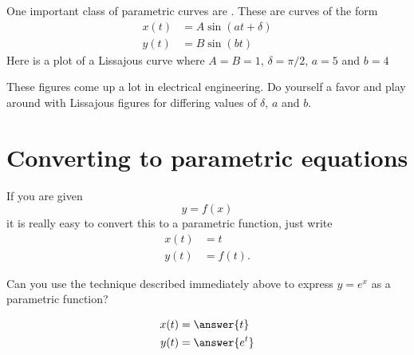 \documentclass{ximera}
\begin{document}
One important class of parametric curves are . These are curves of the form
\begin{align*}
  x(t) &= A \sin(at + \delta)\\
  y(t) &= B\sin(bt)
\end{align*}
Here is a plot of a Lissajous curve where $A=B=1$, $\delta = \pi/2$,
$a=5$ and $b=4$
\begin{image}
\end{image}
These figures come up a lot in electrical engineering. Do yourself a
favor and play around with Lissajous figures for differing values of
$\delta$, $a$ and $b$.





\section{Converting to parametric equations}

If you are given
\[
y = f(x)
\]
it is really easy to convert this to a parametric function, just write
\begin{align*}
  x(t) &= t\\
  y(t) &= f(t).
\end{align*}

\begin{question}
  Can you use the technique described immediately above to express $y
  = e^x$ as a parametric function?
  \begin{prompt}
    \begin{align*}
      x(t) &= \answer{t}\\
      y(t) &= \answer{e^t}
    \end{align*}
  \end{prompt}
\end{question}
\end{document}
